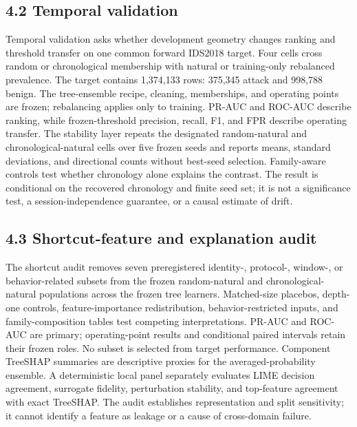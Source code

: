 \documentclass[preprint,12pt]{elsarticle}
\begin{document}
\subsection{4.2 Temporal validation}
Temporal validation asks whether development geometry changes ranking and threshold transfer on one common forward IDS2018 target. Four cells cross random or chronological membership with natural or training-only rebalanced prevalence. The target contains 1,374,133 rows: 375,345 attack and 998,788 benign. The tree-ensemble recipe, cleaning, memberships, and operating points are frozen; rebalancing applies only to training.
PR-AUC and ROC-AUC describe ranking, while frozen-threshold precision, recall, F1, and FPR describe operating transfer. The stability layer repeats the designated random-natural and chronological-natural cells over five frozen seeds and reports means, standard deviations, and directional counts without best-seed selection. Family-aware controls test whether chronology alone explains the contrast. The result is conditional on the recovered chronology and finite seed set; it is not a significance test, a session-independence guarantee, or a causal estimate of drift.

\subsection{4.3 Shortcut-feature and explanation audit}
The shortcut audit removes seven preregistered identity-, protocol-, window-, or behavior-related subsets from the frozen random-natural and chronological-natural populations across the frozen tree learners. Matched-size placebos, depth-one controls, feature-importance redistribution, behavior-restricted inputs, and family-composition tables test competing interpretations. PR-AUC and ROC-AUC are primary; operating-point results and conditional paired intervals retain their frozen roles. No subset is selected from target performance.
Component TreeSHAP summaries are descriptive proxies for the averaged-probability ensemble. A deterministic local panel separately evaluates LIME decision agreement, surrogate fidelity, perturbation stability, and top-feature agreement with exact TreeSHAP. The audit establishes representation and split sensitivity; it cannot identify a feature as leakage or a cause of cross-domain failure.
\end{document}

